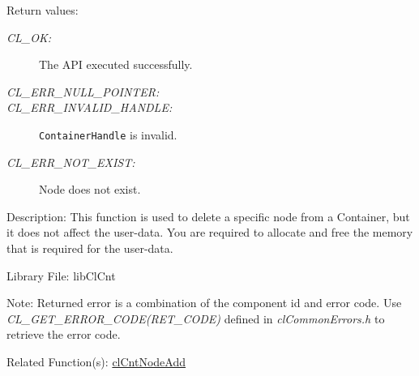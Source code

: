 \begin{Desc}
\item[Return values:]
\begin{description}
\item[{\em CL\_\-OK:}]The API executed successfully. 
\item[{\em CL\_\-ERR\_\-NULL\_\-POINTER:}] 
\item[{\em CL\_\-ERR\_\-INVALID\_\-HANDLE:}] {\tt{ContainerHandle}} is invalid.
\item[{\em CL\_\-ERR\_\-NOT\_\-EXIST:}]Node does not exist.
\end{description}
\end{Desc}
\begin{Desc}
\item[Description:]This function is used to delete a specific node from a Container, but it does not affect the user-data. You are required to allocate and
free the memory that is required for the user-data.\end{Desc}
\begin{Desc}
\item[Library File:]lib\-Cl\-Cnt\end{Desc}
\begin{Desc}
\item[Note:]Returned error is a combination of the component id and error code. Use \textit{CL\_\-GET\_\-ERROR\_\-CODE(RET\_\-CODE)} defined in \textit{clCommonErrors.h} to retrieve the error code.\end{Desc}
\begin{Desc}
\item[Related Function(s):]\hyperlink{pagecnt105}{cl\-Cnt\-Node\-Add} \end{Desc}


\newpage

